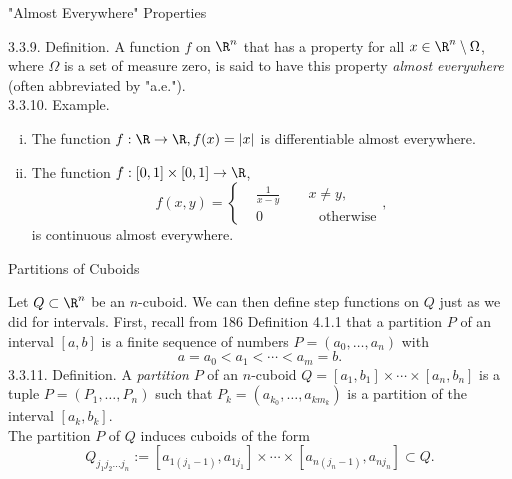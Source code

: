 \documentclass[smaller,hyperref={CJKbookmarks=true}]{beamer}
\begin{document}
\begin{frame}[t]{"Almost Everywhere" Properties}
\begin{spacing}{1.1}
\alert{3.3.9. Definition.} A function $f$ on $\R^n$ that has a property for all $x\in\R^n\setminus\Omega$, where $\Omega$ is a set of measure zero, is said to have this property \emph{almost everywhere} (often abbreviated by "a.e.").\\[5pt]
\alert{3.3.10. Example.}
\begin{enumerate}[(i)]
  \item The function $f:\R\to\R,f(x)=|x|$ is dif{}ferentiable almost everywhere.
  \item The function $f:[0,1]\times[0,1]\to\R$,
      \[f(x,y)=\left\{\begin{aligned}
                        &\frac{1}{x-y}\qquad
                        x\neq y,\\
                        &0\qquad\qquad\text{otherwise}
                      \end{aligned}\right.,\]
      is continuous almost everywhere.
\end{enumerate}
\end{spacing}
\end{frame}
\begin{frame}[t]{Partitions of Cuboids}
\begin{spacing}{1.15}
Let $Q\subset\R^n$ be an $n$-cuboid. We can then define step functions on $Q$ just as we did for intervals. First, recall from 186 Definition 4.1.1 that a partition $P$ of an interval $[a,b]$ is a finite sequence of numbers $P=(a_0,\ldots,a_n)$ with
\[a=a_0<a_1<\cdots<a_m=b.\]
\alert{3.3.11. Definition.} A \emph{partition} $P$ of an $n$-cuboid $Q=[a_1,b_1]\times\cdots
\times[a_n,b_n]$ is a tuple $P=(P_1,\ldots,P_n)$ such that $P_k=(a_{k_0},\ldots,a_{km_k})$ is a partition of the interval $[a_k,b_k]$.\\[5pt]
The partition $P$ of $Q$ induces cuboids of the form
\[Q_{j_1j_2...j_n}:=[a_{1(j_1-1)},a_{1j_1}]
\times\cdots\times[a_{n(j_n-1)},a_{nj_n}]\subset Q.\]
\end{spacing}
\end{frame}
\end{document}
